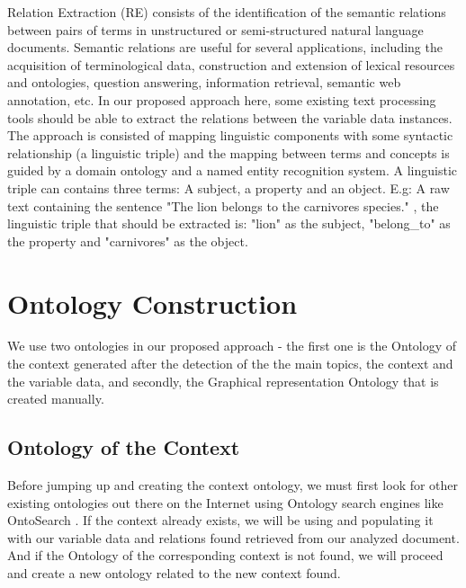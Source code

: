 Relation Extraction (RE) \cite{reeeeeeee} consists of the identification of the semantic relations between pairs of terms in unstructured or semi-structured natural language documents. Semantic relations are useful for several applications, including the acquisition of terminological data, construction and extension of lexical resources and ontologies, question answering, information retrieval, semantic web annotation, etc. In our proposed approach here, some existing text processing tools should be able to extract the relations between the variable data instances. The approach is consisted of mapping linguistic components with some syntactic relationship (a linguistic triple) and the mapping between terms and concepts is guided by a domain ontology and a named entity recognition system. A linguistic triple can contains three terms: A subject, a property and an object. E.g: A raw text containing the sentence "The lion belongs to the carnivores species." , the linguistic triple that should be extracted is: 
"lion" as the subject, "belong\_to" as the property and "carnivores" as the object. 



\section{Ontology Construction}

\label{sec_3}
We use two ontologies in our proposed approach - the first one is the Ontology of the context generated after the detection of the the main topics, the context and the variable data, and secondly, the Graphical representation Ontology that is created manually. 

\subsection{Ontology of the Context}
\label{sec_33}
Before jumping up and creating the context ontology, we must first look for other existing ontologies out there on the Internet using Ontology search engines like OntoSearch \cite{ontosearch}. If the context already exists, we will be using and populating it with our variable data and relations found retrieved from our analyzed document. And if the Ontology of the corresponding context is not found, we will proceed and create a new ontology related to the new context found.  

